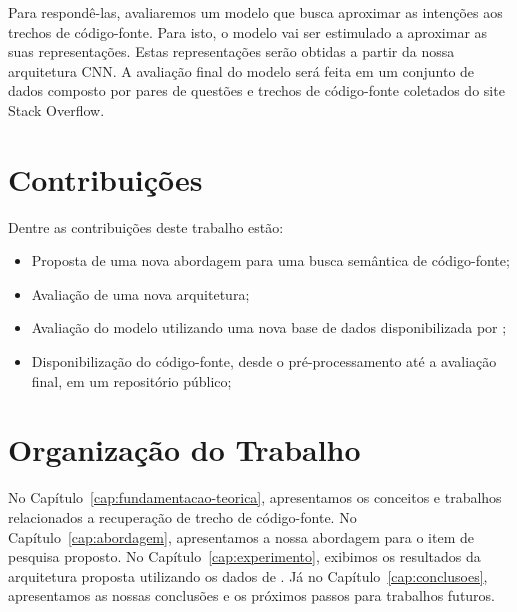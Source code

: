 Para respondê-las, avaliaremos um modelo que busca aproximar as intenções aos trechos de código-fonte. Para isto, o modelo vai ser estimulado a aproximar as suas representações. Estas representações serão obtidas a partir da nossa arquitetura CNN. A avaliação final do modelo será feita em um conjunto de dados composto por pares de questões e trechos de código-fonte coletados do site Stack Overflow. 

\section{Contribuições}
\label{sec:contribucoes}

Dentre as contribuições deste trabalho estão:

\begin{itemize}
\item Proposta de uma nova abordagem para uma busca semântica de código-fonte;
\item Avaliação de uma nova arquitetura;
\item Avaliação do modelo utilizando uma nova base de dados disponibilizada por \cite{yao-2018};
\item Disponibilização do código-fonte, desde o pré-processamento até a avaliação final, em um repositório público;
\end{itemize}

\section{Organização do Trabalho}
\label{sec:organizacao_trabalho}

No Capítulo~\ref{cap:fundamentacao-teorica}, apresentamos os conceitos e trabalhos relacionados a recuperação de trecho de código-fonte. No Capítulo~\ref{cap:abordagem}, apresentamos a nossa abordagem para o item de pesquisa proposto. No Capítulo~\ref{cap:experimento}, exibimos os resultados da arquitetura proposta utilizando os dados de \cite{yao-2018}. Já no Capítulo~\ref{cap:conclusoes}, apresentamos as nossas conclusões e os próximos passos para trabalhos futuros.